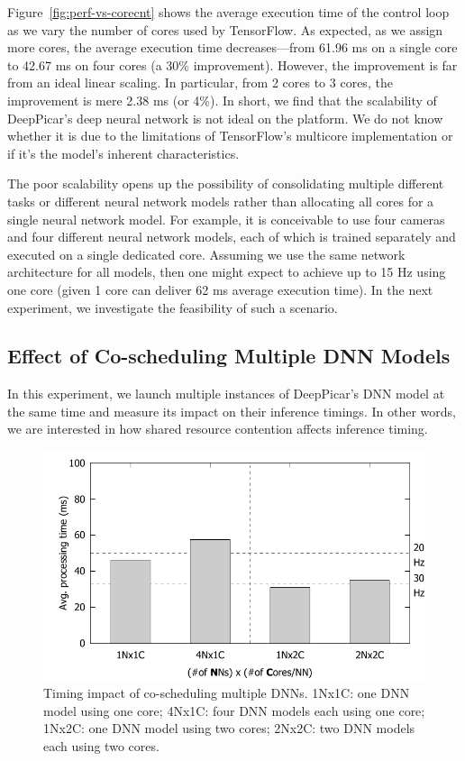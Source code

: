 Figure~\ref{fig:perf-vs-corecnt} shows the average execution time of
the control loop as we vary the number of cores used by
TensorFlow. As expected, as we assign more cores, the average execution
time decreases---from 61.96 ms on a single core to 42.67 ms on four
cores (a 30\% improvement). However, the improvement is far from an ideal
linear scaling. In particular, from 2 cores to 3 cores, the
improvement is mere 2.38 ms (or 4\%). In short, we find that the
scalability of DeepPicar's deep neural network is not ideal on the
platform. We do not know whether it is due to the limitations of
TensorFlow's multicore implementation or if it's the model's inherent
characteristics. 

The poor scalability opens up the possibility of consolidating
multiple different tasks or different neural network models rather
than allocating all cores for a single neural network model. For
example, it is conceivable to use four cameras and four different
neural network models, each of which is trained separately and
executed on a single dedicated core. Assuming we use the same network
architecture for all models, then one might expect to achieve up to
15 Hz using one core (given 1 core can deliver 62 ms average
execution time). In the next experiment, we investigate the
feasibility of such a scenario.

\subsection{Effect of Co-scheduling Multiple DNN Models}

In this experiment, we launch multiple instances of DeepPicar's DNN
model at the same time and measure its impact on their inference
timings. In other words, we are interested in how shared resource
contention affects inference timing.

\begin{figure}[h]
  \centering
  \includegraphics[width=.7\textwidth]{figs/perf_vs_modelcnt}
  \caption{Timing impact of co-scheduling multiple DNNs. 1Nx1C: one DNN
    model using one core; 4Nx1C: four DNN models each using one core;
    1Nx2C: one DNN model using two cores; 2Nx2C: two DNN models each
    using two cores.} 
  \label{fig:perf-vs-modelcnt}
\end{figure}


